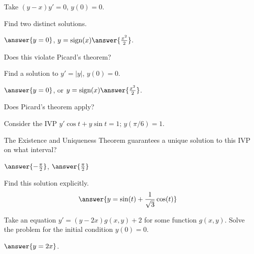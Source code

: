 \documentclass{ximera}
\begin{document}
\begin{exercise}%
    Take $(y-x)y' = 0$, $y(0) = 0$.
    
    Find two distinct solutions.
    
    $\answer{y=0}$, $y = \text{sign}(x)\answer{\frac{x^2}{2}}$.
    \begin{problem}
        Does this violate Picard's theorem?
        \begin{multipleChoice}
        \end{multipleChoice}
    \end{problem}
\end{exercise}

\begin{exercise}
    Find a solution to $y' = \lvert y \rvert$, $y(0) = 0$.  
    
    $\answer{y=0}$, or $y = \text{sign}(x)\answer{\frac{x^2}{2}}$.
    \begin{problem}
        Does Picard's theorem apply?
        \begin{multipleChoice}
        \end{multipleChoice}
    \end{problem}
\end{exercise}

\begin{exercise}
    Consider the IVP $y'\cos t+y\sin t=1; \, y(\pi/6)=1$.%
    
    The Existence and Uniqueness Theorem guarantees a unique solution to this IVP on what interval?
    
    \wordChoice{\choice[correct]{(},\choice{[}}$\answer{-\frac{\pi}{2}}$, $\answer{\frac{\pi}{2}}$\wordChoice{\choice[correct]{)},\choice{]}}
    \begin{problem}
        Find this solution explicitly.
        \[
            \answer{y = \sin(t) + \frac{1}{\sqrt{3}}\cos(t)}
        \]
    \end{problem}

\end{exercise}

\begin{exercise}
    Take an equation $y' = (y-2x) g(x,y) + 2$ for some function $g(x,y)$. Solve the problem for the initial condition $y(0) = 0$.
    
    $\answer{y = 2x}$.
\end{exercise}
\end{document}
